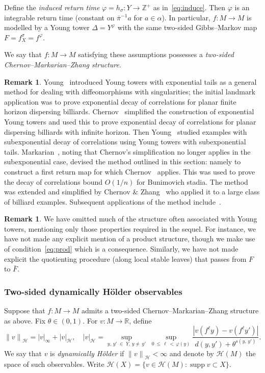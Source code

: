 \documentclass[10pt]{amsart}
\theoremstyle{definition}\newtheorem{defi}[theo]{Definition}\newtheorem{rema}[theo]{Remark}\newtheorem{exam}[theo]{Example}\newtheorem{exem}[theo]{Example}\newtheorem{nota}[theo]{Notation}
\newcommand{\R}{\mathbb{R}}
\newcommand{\Z}{\mathbb{Z}}
\newcommand{\cH}{\mathcal{H}}
\DeclareMathOperator{\supp}{supp}
\newcommand{\bF}{\bar{F}}
\begin{document}
Define the \emph{induced return time} $\varphi=h_\sigma:Y\to\Z^+$ as in~\eqref{eq:induce}. Then $\varphi$ is an integrable return time (constant on $\bar\pi^{-1}a$ for $a\in\alpha$). In particular, $f:M\to M$ is modelled by a Young tower $\Delta=Y^\varphi$ with the same two-sided Gibbs--Markov map $F=f_X^\sigma=f^\varphi$.

We say that $f:M\to M$ satisfying these assumptions possesses a \emph{two-sided Chernov--Markarian--Zhang structure}.

\begin{rema}\label{rmk:CMZ2}
Young~\cite{Young98} introduced Young towers with exponential tails as a general method for dealing with diffeomorphisms with singularities; the initial landmark application was to prove exponential decay of correlations for planar finite horizon dispersing billiards. Chernov~\cite{Chernov99} simplified the construction of exponential Young towers and used this to prove exponential decay of correlations for planar dispersing billiards with infinite horizon. Then Young~\cite{Young99} studied examples with subexponential decay of correlations using Young towers with subexponential tails. Markarian~\cite{Markarian04}, noting that Chernov's simplification no longer applies in the subexponential case, devised the method outlined in this section: namely to construct a first return map for which Chernov~\cite{Chernov99} applies. This was used to prove the decay of correlations bound $O(1/n)$ for Bunimovich stadia. The method was extended and simplified by Chernov \& Zhang~\cite{ChernovZhang05} who applied it to a large class of billiard examples. Subsequent applications of the method include~\cite{ChernovMarkarian07,ChernovZhang05b,Zhang17a}.
\end{rema}

\begin{rema}
We have omitted much of the structure often associated with Young towers, mentioning only those properties required in the sequel.
For instance, we have not made any explicit mention of a product structure, though we make use of condition~\eqref{eq:prod} which is a consequence. Similarly, we have not made explicit the quotienting procedure (along local stable leaves) that passes from $F$ to $\bF$.
\end{rema}

\subsubsection*{Two-sided dynamically H\"older observables}
Suppose that $f:M\to M$ admits a two-sided Chernov--Markarian--Zhang structure as above. Fix $\theta\in(0,1)$. For $v:M\to\R$, define
\[
{\|v\|}_\cH=|v|_\infty+{|v|}_\cH, \quad {|v|}_\cH=\sup_{y,\,y'\;\in\; Y,\,y\neq\,y'}\;\sup_{0\,\le\,\ell\,<\,\varphi(y)}
\frac{|v(f^\ell y)-v(f^\ell y')|}{d(y,y')+\theta^{s(y,\,y')}}.
\]
We say that $v$ is \emph{dynamically H\"older} if ${\|v\|}_\cH<\infty$ and denote by $\cH(M)$ the space of such observables. Write $\cH(X)=\{v\in \cH(M):\supp v\subset X\}$.
\end{document}
